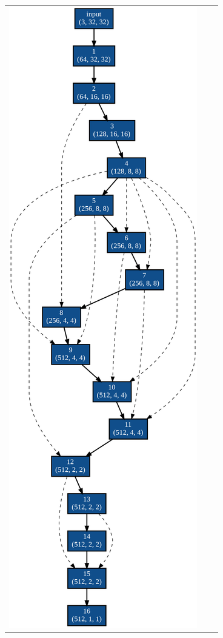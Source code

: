 \documentclass[twocolumn]{jarticle}     %
\begin{document}
\begin{figure}[tb]
  \begin{tabular}{ccc}
    \begin{minipage}[t]{0.3\hsize}
      \centering
      \includegraphics[clip,scale=0.25]{max.png}

\end{minipage}
\end{tabular}
\end{figure}
\end{document}
